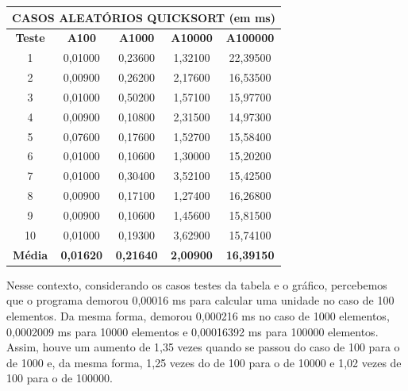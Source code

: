 \documentclass[a4paper, 12pt]{article}
\begin{document}
\begin{minipage}{1.05\textwidth}
\begin{minipage}[c]{0.46\textwidth}
\begin{tabular}{ccccc}
 \multicolumn{ 5}{c}{{\bf CASOS ALEATÓRIOS QUICKSORT (em ms)}} \\
\hline
{\bf Teste} & {\bf A100} & {\bf A1000} & {\bf A10000} & {\bf A100000} \\
\hline
         1 &    0,01000 &    0,23600 &    1,32100 &   22,39500 \\
\hline
         2 &    0,00900 &    0,26200 &    2,17600 &   16,53500 \\
\hline
         3 &    0,01000 &    0,50200 &    1,57100 &   15,97700 \\
\hline
         4 &    0,00900 &    0,10800 &    2,31500 &   14,97300 \\
\hline
         5 &    0,07600 &    0,17600 &    1,52700 &   15,58400 \\
\hline
         6 &    0,01000 &    0,10600 &    1,30000 &   15,20200 \\
\hline
         7 &    0,01000 &    0,30400 &    3,52100 &   15,42500 \\
\hline
         8 &    0,00900 &    0,17100 &    1,27400 &   16,26800 \\
\hline
         9 &    0,00900 &    0,10600 &    1,45600 &   15,81500 \\
\hline
        10 &    0,01000 &    0,19300 &    3,62900 &   15,74100 \\
\hline
{\bf Média} & {\bf 0,01620} & {\bf 0,21640} & {\bf 2,00900} & {\bf 16,39150} \\
\hline
\end{tabular}  
\end{minipage}\hfill
\begin{minipage}[c]{0.49\textwidth}
\centering
{}
\end{minipage}
\end{minipage}
\vspace{0.8cm}

Nesse contexto, considerando os casos testes da tabela e o gráfico, percebemos que o programa demorou 0,00016 ms para calcular uma unidade no caso de 100 elementos. Da mesma forma, demorou 0,000216 ms no caso de 1000 elementos, 0,0002009 ms para 10000 elementos e 0,00016392 ms para 100000 elementos. Assim, houve um aumento de 1,35 vezes quando se passou do caso de 100 para o de 1000 e, da mesma forma, 1,25 vezes do de 100 para o de 10000 e 1,02 vezes de 100 para o de 100000.
\end{document}

